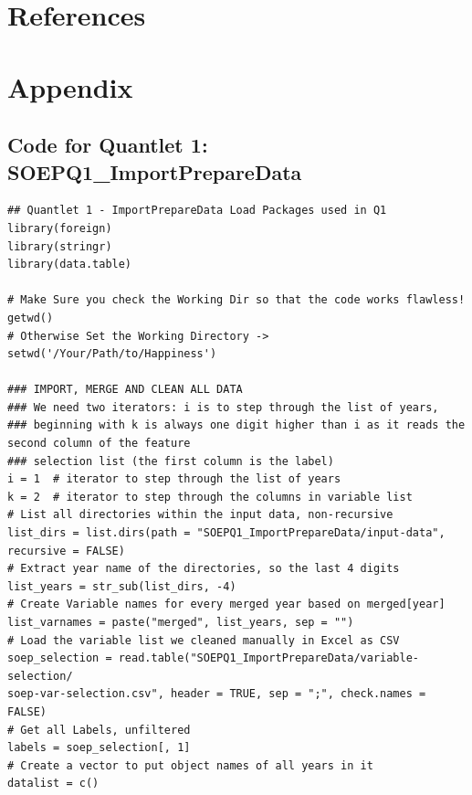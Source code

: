\documentclass[a4paper]{article}
\begin{document}
{\section{References}


\newpage
\section{Appendix}
\subsection{Code for Quantlet 1: SOEPQ1\_ImportPrepareData}
\begin{lstlisting}[numbers=none]
## Quantlet 1 - ImportPrepareData Load Packages used in Q1
library(foreign)
library(stringr)
library(data.table)

# Make Sure you check the Working Dir so that the code works flawless!
getwd()
# Otherwise Set the Working Directory -> setwd('/Your/Path/to/Happiness')

### IMPORT, MERGE AND CLEAN ALL DATA 
### We need two iterators: i is to step through the list of years,
### beginning with k is always one digit higher than i as it reads the 
second column of the feature
### selection list (the first column is the label)
i = 1  # iterator to step through the list of years
k = 2  # iterator to step through the columns in variable list
# List all directories within the input data, non-recursive
list_dirs = list.dirs(path = "SOEPQ1_ImportPrepareData/input-data", 
recursive = FALSE)
# Extract year name of the directories, so the last 4 digits
list_years = str_sub(list_dirs, -4)
# Create Variable names for every merged year based on merged[year]
list_varnames = paste("merged", list_years, sep = "")
# Load the variable list we cleaned manually in Excel as CSV
soep_selection = read.table("SOEPQ1_ImportPrepareData/variable-selection/
soep-var-selection.csv", header = TRUE, sep = ";", check.names = FALSE)
# Get all Labels, unfiltered
labels = soep_selection[, 1]
# Create a vector to put object names of all years in it
datalist = c()


\end{lstlisting}}
\end{document}
